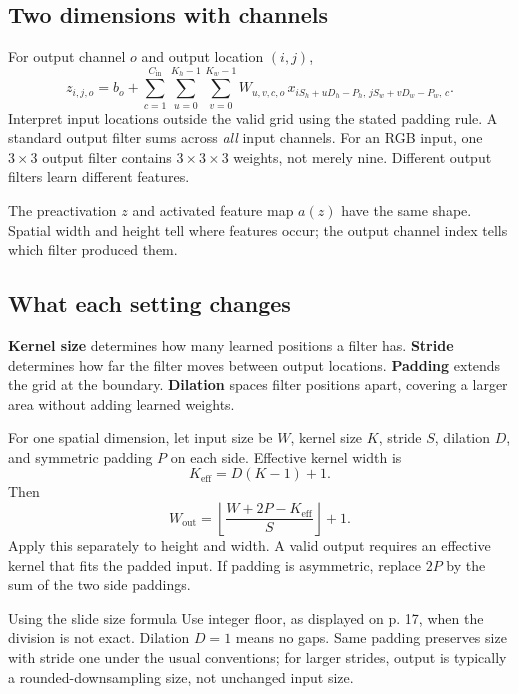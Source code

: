 \documentclass[11pt]{article}
\begin{document}
\subsection{Two dimensions with channels}
For output channel $o$ and output location $(i,j)$,
\[
z_{i,j,o}=b_o+\sum_{c=1}^{C_{\mathrm{in}}}\sum_{u=0}^{K_h-1}\sum_{v=0}^{K_w-1}
W_{u,v,c,o}\,x_{iS_h+uD_h-P_h,\,jS_w+vD_w-P_w,\,c}.
\]
Interpret input locations outside the valid grid using the stated padding rule. A standard output filter sums across \emph{all} input channels. For an RGB input, one $3\times3$ output filter contains $3\times3\times3$ weights, not merely nine. Different output filters learn different features.

The preactivation $z$ and activated feature map $a(z)$ have the same shape. Spatial width and height tell where features occur; the output channel index tells which filter produced them.
\subsection{What each setting changes}
\textbf{Kernel size} determines how many learned positions a filter has. \textbf{Stride} determines how far the filter moves between output locations. \textbf{Padding} extends the grid at the boundary. \textbf{Dilation} spaces filter positions apart, covering a larger area without adding learned weights.

For one spatial dimension, let input size be $W$, kernel size $K$, stride $S$, dilation $D$, and symmetric padding $P$ on each side. Effective kernel width is
\[
K_{\mathrm{eff}}=D(K-1)+1.
\]
Then
\[
\boxed{W_{\mathrm{out}}=\left\lfloor\frac{W+2P-K_{\mathrm{eff}}}{S}\right\rfloor+1}.
\]
Apply this separately to height and width. A valid output requires an effective kernel that fits the padded input. If padding is asymmetric, replace $2P$ by the sum of the two side paddings.
\begin{careful}{Using the slide size formula}
Use integer floor, as displayed on p. 17, when the division is not exact. Dilation $D=1$ means no gaps. Same padding preserves size with stride one under the usual conventions; for larger strides, output is typically a rounded-downsampling size, not unchanged input size.
\end{careful}
\end{document}
